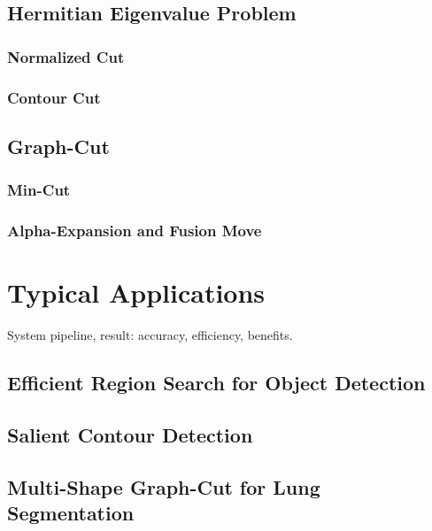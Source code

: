\documentclass{SMBV12}
\begin{document}
\subsection{Hermitian Eigenvalue Problem}

\subsubsection{Normalized Cut}

\cite{shi2000normalized}

\subsubsection{Contour Cut}

\subsection{Graph-Cut}

\subsubsection{Min-Cut}

\subsubsection{Alpha-Expansion and Fusion Move}

\section{Typical Applications}

System pipeline, result: accuracy, efficiency, benefits.

\subsection{Efficient Region Search for Object Detection}

\cite{VijayGrauman2011}

\subsection{Salient Contour Detection}

\cite{KenGalShi2011}

\subsection{Multi-Shape Graph-Cut for Lung Segmentation}
\end{document}
